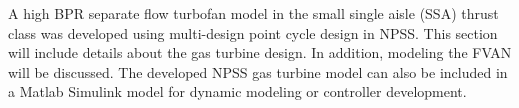 
A high BPR separate flow turbofan model in the small single aisle (SSA) thrust class was developed using multi-design point cycle design \cite{Schutte:2012:2,Schutte:2012:1} in NPSS. This section will include details about the gas turbine design. In addition, modeling the FVAN will be discussed. The developed NPSS gas turbine model can also be included in a Matlab Simulink model for dynamic modeling or controller development. 
